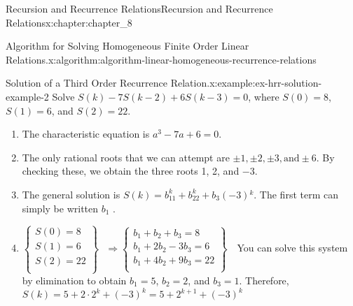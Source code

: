 \documentclass[oneside,10pt,]{book}
\numberwithin{equation}{section}
\begin{document}
\begin{chapterptx}{Recursion and Recurrence Relations}{}{Recursion and Recurrence Relations}{}{}{x:chapter:chapter_8}
\begin{algorithm}{Algorithm for Solving Homogeneous Finite Order Linear Relations.}{}{x:algorithm:algorithm-linear-homogeneous-recurrence-relations}
\begin{enumerate}[label=(\alph*)]
\end{enumerate}
%
\end{algorithm}
\begin{example}{Solution of a Third Order Recurrence Relation.}{x:example:ex-hrr-solution-example-2}%
Solve \(S(k) - 7S(k - 2) + 6S(k - 3) = 0\), where \(S(0) =8\), \(S(1) = 6\), and \(S(2) = 22\).%
\par
%
\begin{enumerate}[label=(\alph*)]
\item{}The characteristic equation is \(a^3 - 7a + 6 = 0\).%
\item{}The only rational roots that we can attempt are \(\pm  1, \pm 2, \pm 3, \textrm{and} \pm 6\). By checking these, we obtain the three roots 1, 2, and \(-3\).%
\item{}The general solution is \(S(k) =b_11^k+b_22^k+b_3(-3){}^k\). The first term can simply be written \(b_1\) .%
\item{}\(\left\{
\begin{array}{c}
S(0)=8 \\
S(1)=6 \\
S(2)=22 \\
\end{array}
\right\}\textrm{   }\Rightarrow \left\{
\begin{array}{c}
b_1+b_2+b_3=8 \\
b_1+2b_2-3b_3=6 \\
b_1+4b_2+9b_3=22 \\
\end{array}
\right\}\textrm{  }\) You can solve this system by elimination to obtain \(b_1=5\), \(b_2=2\), and \(b_3=1\). Therefore, \(\quad\)\(S(k) = 5 + 2\cdot 2^k + (-3)^k = 5 + 2^{k+1} + (-3)^k\)%
\end{enumerate}
%
\end{example}
\end{chapterptx}
%
%
\typeout{************************************************}
\typeout{************************************************}
%
\end{document}
